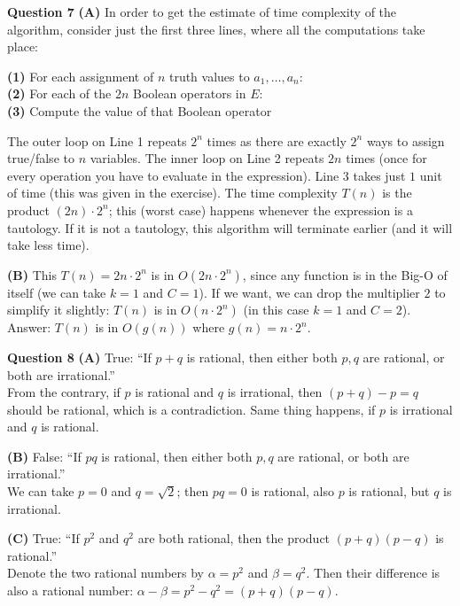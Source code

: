 \documentclass[jou]{apa6}
\begin{document}
\vspace{10pt}
{\bf Question 7} 
{\bf (A)} In order to get the estimate of time complexity of the algorithm, 
consider just the first three lines, where all the computations take place:

\vspace{3pt}
{\bf (1)} \hspace{0.0in} For each assignment of $n$ truth values to $a_1,\ldots,a_n$:\\
{\bf (2)} \hspace{0.2in} For each of the $2n$ Boolean operators in $E$:\\
{\bf (3)} \hspace{0.4in} Compute the value of that Boolean operator

\vspace{3pt}
The outer loop on Line 1 repeats $2^n$ times as there are exactly $2^n$ ways to assign true/false to 
$n$ variables. The inner loop on Line 2 repeats $2n$ times (once for every operation you have to evaluate
in the expression). Line 3 takes just $1$ unit of time (this was given in the exercise). 
The time complexity $T(n)$ is the product $(2n) \cdot 2^n$; this (worst case) happens
whenever the expression is a tautology. If it is not a tautology, this algorithm will terminate earlier 
(and it will take less time). 

{\bf (B)}
This $T(n) = 2n\cdot{}2^n$ is in $O(2n\cdot{}2^n)$, since any function
is in the Big-O of itself (we can take $k = 1$ and $C = 1$). If we want, we can drop the multiplier $2$
to simplify it slightly: $T(n)$ is in $O(n\cdot{}2^n)$ (in this case $k = 1$ and $C = 2$).\\
Answer: $T(n)$ is in $O(g(n))$ where $g(n) = n\cdot{}2^n$.

\vspace{10pt}
{\bf Question 8} 
{\bf (A)} True: ``If $p + q$ is rational, then either both $p,q$ are rational, or both are irrational.''\\
From the contrary, if $p$ is rational and $q$ is irrational, then $(p + q) - p = q$ should be rational, 
which is a contradiction. Same thing happens, if $p$ is irrational and $q$ is rational. 

{\bf (B)} False: ``If $pq$ is rational, then either both $p,q$ are rational, or both are irrational.''\\
We can take $p = 0$ and $q = \sqrt{2}$; then $pq = 0$ is rational, also $p$ is rational, but $q$ is irrational. 
 
{\bf (C)} True: ``If $p^2$ and $q^2$ are both rational, then the product $(p+q)(p-q)$ is rational.''\\
Denote the two rational numbers by $\alpha = p^2$ and $\beta = q^2$. Then their difference is 
also a rational number: $\alpha - \beta = p^2 - q^2 = (p+q)(p-q)$. 
\end{document}
